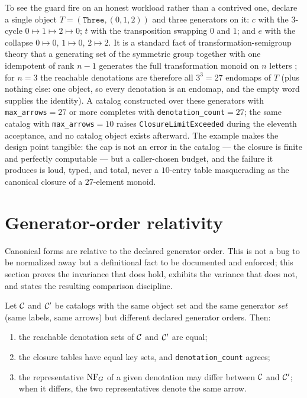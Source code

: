 \begin{example}\label{ch08:ex:captrip}
To see the guard fire on an honest workload rather than a contrived one,
declare a single object $T=(\texttt{Three},(0,1,2))$ and three generators on
it: $c$ with the $3$-cycle $0\mapsto 1\mapsto 2\mapsto 0$; $t$ with the
transposition swapping $0$ and $1$; and $e$ with the collapse
$0\mapsto 0$, $1\mapsto 0$, $2\mapsto 2$. It is a standard fact of
transformation-semigroup theory that a generating set of the symmetric
group together with one idempotent of rank $n-1$ generates the full
transformation monoid on $n$ letters \cite{howie}; for $n=3$ the reachable
denotations are therefore all $3^3=27$ endomaps of $T$ (plus nothing else:
one object, so every denotation is an endomap, and the empty word supplies
the identity). A catalog constructed over these generators with
\texttt{max\_arrows}${}=27$ or more completes with
\texttt{denotation\_count}${}=27$; the same catalog with
\texttt{max\_arrows}${}=10$ raises \texttt{ClosureLimitExceeded} during the
eleventh acceptance, and no catalog object exists afterward. The example
makes the design point tangible: the cap is not an error in the catalog ---
the closure is finite and perfectly computable --- but a caller-chosen
budget, and the failure it produces is loud, typed, and total, never a
$10$-entry table masquerading as the canonical closure of a $27$-element
monoid.
\end{example}

\section{Generator-order relativity}\label{ch08:sec:orderrel}

Canonical forms are relative to the declared generator order. This is not a
bug to be normalized away but a definitional fact to be documented and
enforced; this section proves the invariance that does hold, exhibits the
variance that does not, and states the resulting comparison discipline.

\begin{proposition}\label{ch08:prop:orderrel}
Let $\mathcal{C}$ and $\mathcal{C}'$ be catalogs with the same object set and the same
generator \emph{set} (same labels, same arrows) but different declared
generator orders. Then:
\begin{enumerate}
\item the reachable denotation sets of $\mathcal{C}$ and $\mathcal{C}'$ are equal;
\item the closure tables have equal key sets, and
  \texttt{denotation\_count} agrees;
\item the representative $\mathrm{NF}_G$ of a given denotation may differ between
  $\mathcal{C}$ and $\mathcal{C}'$; when it differs, the two representatives denote the
  same arrow.
\end{enumerate}
\end{proposition}

